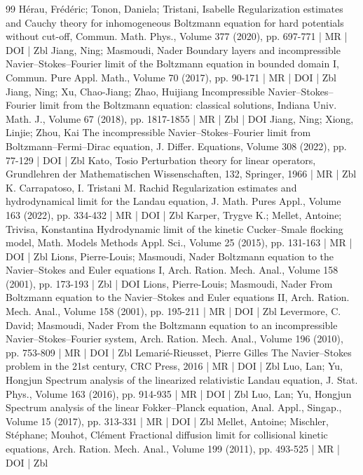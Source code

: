 \begin{thebibliography}{99}
 Hérau, Frédéric; Tonon, Daniela; Tristani, Isabelle Regularization estimates and Cauchy theory for inhomogeneous Boltzmann equation for hard potentials without cut-off, Commun. Math. Phys., Volume 377 (2020), pp. 697-771 | MR | DOI | Zbl
 Jiang, Ning; Masmoudi, Nader Boundary layers and incompressible Navier–Stokes–Fourier limit of the Boltzmann equation in bounded domain I, Commun. Pure Appl. Math., Volume 70 (2017), pp. 90-171 | MR | DOI | Zbl
 Jiang, Ning; Xu, Chao-Jiang; Zhao, Huijiang Incompressible Navier–Stokes–Fourier limit from the Boltzmann equation: classical solutions, Indiana Univ. Math. J., Volume 67 (2018), pp. 1817-1855 | MR | Zbl | DOI
 Jiang, Ning; Xiong, Linjie; Zhou, Kai The incompressible Navier–Stokes–Fourier limit from Boltzmann–Fermi–Dirac equation, J. Differ. Equations, Volume 308 (2022), pp. 77-129 | DOI | Zbl
 Kato, Tosio Perturbation theory for linear operators, Grundlehren der Mathematischen Wissenschaften, 132, Springer, 1966 | MR | Zbl
 K. Carrapatoso, I. Tristani M. Rachid Regularization estimates and hydrodynamical limit for the Landau equation, J. Math. Pures Appl., Volume 163 (2022), pp. 334-432 | MR | DOI | Zbl
 Karper, Trygve K.; Mellet, Antoine; Trivisa, Konstantina Hydrodynamic limit of the kinetic Cucker–Smale flocking model, Math. Models Methods Appl. Sci., Volume 25 (2015), pp. 131-163 | MR | DOI | Zbl
 Lions, Pierre-Louis; Masmoudi, Nader Boltzmann equation to the Navier–Stokes and Euler equations I, Arch. Ration. Mech. Anal., Volume 158 (2001), pp. 173-193 | Zbl | DOI
 Lions, Pierre-Louis; Masmoudi, Nader From Boltzmann equation to the Navier–Stokes and Euler equations II, Arch. Ration. Mech. Anal., Volume 158 (2001), pp. 195-211 | MR | DOI | Zbl
 Levermore, C. David; Masmoudi, Nader From the Boltzmann equation to an incompressible Navier–Stokes–Fourier system, Arch. Ration. Mech. Anal., Volume 196 (2010), pp. 753-809 | MR | DOI | Zbl
 Lemarié-Rieusset, Pierre Gilles The Navier–Stokes problem in the 21st century, CRC Press, 2016 | MR | DOI | Zbl
 Luo, Lan; Yu, Hongjun Spectrum analysis of the linearized relativistic Landau equation, J. Stat. Phys., Volume 163 (2016), pp. 914-935 | MR | DOI | Zbl
 Luo, Lan; Yu, Hongjun Spectrum analysis of the linear Fokker–Planck equation, Anal. Appl., Singap., Volume 15 (2017), pp. 313-331 | MR | DOI | Zbl
 Mellet, Antoine; Mischler, Stéphane; Mouhot, Clément Fractional diffusion limit for collisional kinetic equations, Arch. Ration. Mech. Anal., Volume 199 (2011), pp. 493-525 | MR | DOI | Zbl

\end{thebibliography}
